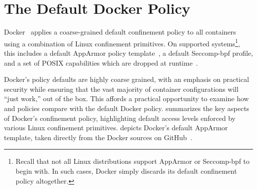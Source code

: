 \section{The Default Docker Policy}

Docker~\cite{docker_security} applies a coarse-grained default confinement policy to all
containers using a combination of Linux confinement primitives. On supported
systems\footnote{Recall that not all Linux distributions support AppArmor or Seccomp-bpf
to begin with. In such cases, Docker simply discards its default confinement policy
altogether.}, this includes a default AppArmor policy template~\cite{docker_apparmor,
docker_default_apparmor}, a default Seccomp-bpf profile, and a set of POSIX capabilities
which are dropped at runtime~\cite{docker_security}.

Docker's policy defaults are highly coarse grained, with an emphasis on practical security
while ensuring that the vast majority of container configurations will \enquote{just
work,} out of the box. This affords a practical opportunity to examine how \bpfbox{} and
\bpfcontain{} policies compare with the default Docker policy. 
summarizes the key aspects of Docker's confinement policy, highlighting default access
levels enforced by various Linux confinement primitives.  depicts
Docker's default AppArmor template, taken directly from the Docker sources on
GitHub~\cite{docker_default_apparmor}.

